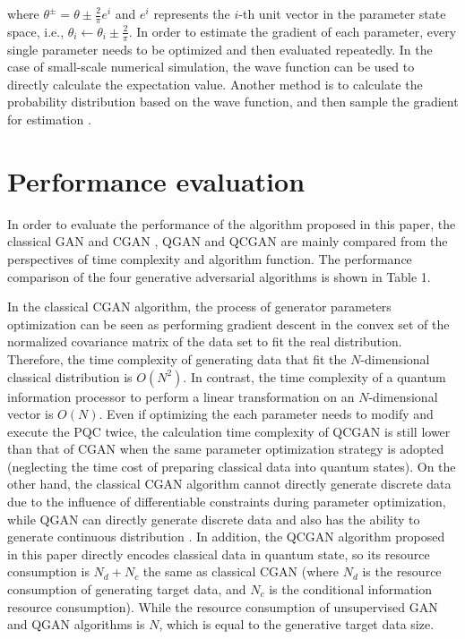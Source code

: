 \documentclass{bmcart}
\begin{document}
%
where ${\theta ^ \pm } = \theta  \pm \frac{2}{\pi }{e^i}$ and ${e^i}$ represents the $i$-th unit vector in the parameter state space, i.e., ${\theta _i} \leftarrow {\theta _i} \pm \frac{2}{\pi }$. In order to estimate the gradient of each parameter, every single parameter needs to be optimized and then evaluated repeatedly. In the case of small-scale numerical simulation, the wave function can be used to directly calculate the expectation value. Another method is to calculate the probability distribution based on the wave function, and then sample the gradient for estimation \cite{Situ}.


\section{Performance evaluation}
In order to evaluate the performance of the algorithm proposed in this paper, the classical GAN \cite{Good} and CGAN \cite{Mirza}, QGAN \cite{Seth} and QCGAN are mainly compared from the perspectives of time complexity and algorithm function. The performance comparison of the four generative adversarial algorithms is shown in Table 1.


In the classical CGAN algorithm, the process of generator parameters optimization can be seen as performing gradient descent in the convex set of the normalized covariance matrix of the data set to fit the real distribution. Therefore, the time complexity of generating data that fit the $N$-dimensional classical distribution is $O({N^2})$. In contrast, the time complexity of a quantum information processor to perform a linear transformation on an $N$-dimensional vector is $O(N)$. Even if optimizing the each parameter needs to modify and execute the PQC twice, the calculation time complexity of QCGAN is still lower than that of CGAN when the same parameter optimization strategy is adopted (neglecting the time cost of preparing classical data into quantum states). On the other hand, the classical CGAN algorithm cannot directly generate discrete data due to the influence of differentiable constraints during parameter optimization, while QGAN can directly generate discrete data and also has the ability to generate continuous distribution \cite{1901.00848}. In addition, the QCGAN algorithm proposed in this paper directly encodes classical data in quantum state, so its resource consumption is ${N_d} + {N_c}$ the same as classical CGAN (where ${N_d}$ is the resource consumption of generating target data, and ${N_c}$ is the conditional information resource consumption). While the resource consumption of unsupervised GAN and QGAN algorithms is $N$, which is equal to the generative target data size.
\end{document}

